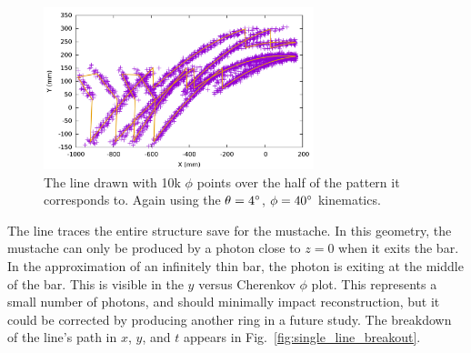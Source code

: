 \begin{figure}[!h]
\centering
\includegraphics[width=0.7\textwidth]{pics/line_overpoints_2d.pdf}
\caption{The line drawn with 10k $\phi$ points over the half of the pattern it corresponds to.  Again using the $\theta=4^{\circ}$, $\phi=40^{\circ}$ kinematics.}
\label{fig:single_tracing_line}
\end{figure}

The line traces the entire structure save for the mustache.  In this geometry, the mustache can only be produced by a photon close to $z=0$ when it exits the bar.  In the approximation of an infinitely thin bar, the photon is exiting at the middle of the bar.  This is visible in the $y$ versus Cherenkov $\phi$ plot.  This represents a small number of photons, and should minimally impact reconstruction, but it could be corrected by producing another ring in a future study.  The breakdown of the line's path in $x$, $y$, and $t$ appears in Fig.~\ref{fig:single_line_breakout}.

